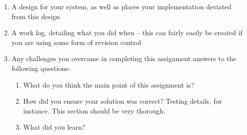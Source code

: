 \documentclass[letterpaper,10pt,titlepage]{article}
\begin{document}
\begin{enumerate}
	\item A design for your system, as well as places your implementation deviated from this design

	\item A work log, detailing what you did when -- this can fairly easily be created if you are using some form of revision control

	\item Any challenges you overcame in completing this assignment answers to the following questions:
		\begin {enumerate}
			\item What do you think the main point of this assignment is?

			\item How did you ensure your solution was correct? Testing details, for instance. This section should be very thorough.

			\item What did you learn?
		\end {enumerate}

\end{enumerate}
\end{document}
